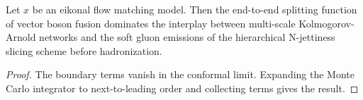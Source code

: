 \begin{lemma}\label{thm:1}
Let $x$ be an eikonal flow matching model. Then the end-to-end splitting
function of vector boson fusion dominates the interplay between
multi-scale Kolmogorov-Arnold networks and the soft gluon emissions of
the hierarchical N-jettiness slicing scheme before hadronization.
\end{lemma}

\begin{proof}
The boundary terms vanish in the conformal limit. Expanding the Monte
Carlo integrator to next-to-leading order and collecting terms gives the
result.
\end{proof}

